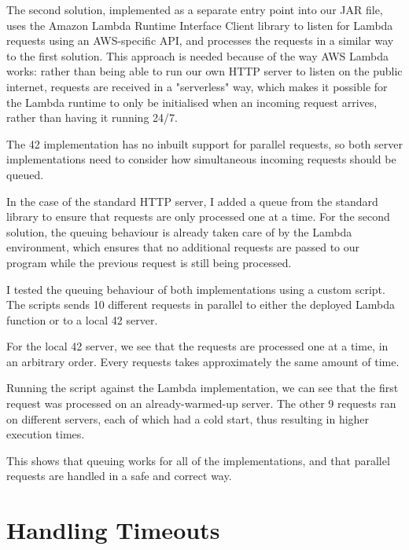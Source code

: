 The second solution, implemented as a separate entry point into our JAR file, uses the Amazon Lambda Runtime Interface Client library to listen for Lambda requests using an AWS-specific API, and processes the requests in a similar way to the first solution. This approach is needed because of the way AWS Lambda works: rather than being able to run our own HTTP server to listen on the public internet, requests are received in a "serverless" way, which makes it possible for the Lambda runtime to only be initialised when an incoming request arrives, rather than having it running 24/7.

The 42 implementation has no inbuilt support for parallel requests, so both server implementations need to consider how simultaneous incoming requests should be queued.

In the case of the standard HTTP server, I added a queue from the standard library to ensure that requests are only processed one at a time. For the second solution, the queuing behaviour is already taken care of by the Lambda environment, which ensures that no additional requests are passed to our program while the previous request is still being processed.

I tested the queuing behaviour of both implementations using a custom script. The scripts sends 10 different requests in parallel to either the deployed Lambda function or to a local 42 server.

For the local 42 server, we see that the requests are processed one at a time, in an arbitrary order. Every requests takes approximately the same amount of time.


Running the script against the Lambda implementation, we can see that the first request was processed on an already-warmed-up server. The other 9 requests ran on different servers, each of which had a cold start, thus resulting in higher execution times.


This shows that queuing works for all of the implementations, and that parallel requests are handled in a safe and correct way.

\section{Handling Timeouts}

